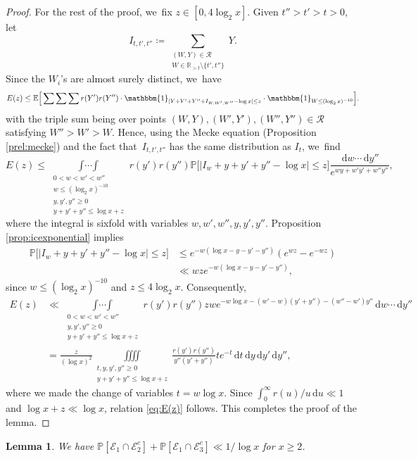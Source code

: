 \documentclass[JEP,XML,SOM,Unicode,published]{cedram}
\newcommand{\RR}{\mathbb{R}}
\newcommand{\PP}{\mathbb{P}}
\newcommand{\EE}{\mathbb{E}}
\newcommand{\dee}{\,\mathrm{d}}
\newcommand{\one}{\mathbbm{1}}
\newcommand{\EC}{\mathcal{E}}
\newcommand{\RS}{\mathscr{R}}
\newcommand{\bg}{\big}
\newcommand{\bgg}{\Big}
\theoremstyle{plain}
\newtheorem{lem}[cor]{Lemma}
\theoremstyle{definition}
\begin{document}
\begin{proof}
For the rest of the proof, we~fix $z\in[0,4\log_2x]$.
Given $t''>t'>t > 0$, let
\[
I_{t,t',t''}\coloneqq \sum_{\substack{(W,Y)\in\RS\\ W\in\RR_{>t}\setminus\{t',t''\}}} Y.
\]
Since the $W_i$'s are almost surely distinct, we~have
\begin{align*}
E(z) \le \EE\bgg[ \mathop{\sum\sum\sum}
r(Y')r(Y'') \cdot \one_{|Y+Y'+Y''+I_{W,W',W''}-\log x|\le z} \cdot \one_{W \le (\log_2x)^{-10}} \bgg].
\end{align*}
with the triple sum being over points $(W,Y),(W',Y'),(W'',Y'')\in\RS$ satisfying \hbox{$W''>W'>W$}. Hence, using the Mecke equation (Proposition \ref{prel:mecke}) and the fact that~$I_{t, t', t''}$ has the same distribution as $I_{t}$, we~find
\[
E(z) \le \mathop{\int\cdots\int}\limits_{\substack{0<w<w'<w'' \\ w\le (\log_2x)^{-10} \\ y,y',y''\ge0 \\ y+y'+y''\le \log x+z }} r(y')r(y'')
\PP\bgg[ \bg|I_w+y+y'+y''-\log x\bg|\le z\bgg]
\frac{\dee w\cdots \dee y''}{ e^{wy+w'y'+w''y''}},
\]
where the integral is sixfold with variables $w,w',w'',y,y',y''$. Proposition \ref{prop:icexponential} implies
\begin{align*}
\PP\bgg[ \bg|I_w+y+y'+y''-\log x\bg|\le z\bgg] &\le e^{-w(\log x-y-y'-y'')} (e^{wz}-e^{-wz}) \\
&\ll wz e^{-w(\log x-y-y'-y'')},
\end{align*}
since $w\le(\log_2x)^{-10}$ and $z\le 4\log_2x$. Consequently,
\[
\begin{split}
E(z) &\ll
\mathop{\int\cdots\int}\limits_{\substack{0<w<w'<w'' \\ y,y',y''\ge0 \\ y+y'+y''\le \log x+z }} r(y')r(y'')
zwe^{-w\log x-(w'-w)(y'+y'')-(w''-w')y''}\dee w\cdots \dee y'' \\
&= \frac{z}{(\log x)^2} \iiiint\limits_{\substack{t,y,y',y''\ge 0 \\ y+y'+y''\le \log x+z }} \frac{r(y')r(y'')}{y''(y'+y'')}
t e^{-t} \dee t\dee y\dee y'\dee y'',
\end{split}
\]
where we made the change of variables $t=w\log x$. Since $\int_0^\infty r(u)/u \dee u\ll 1$ and $\log x+z\ll\log x$, relation \eqref{eq:E(z)} follows. This completes the proof of the lemma.
\end{proof}

\begin{lem}
\label{lem:prob e2c e3c}
We have $\PP[\EC_1 \cap \EC_2^c] + \PP[\EC_1 \cap \EC_3^c] \ll 1/\log x$ for $x\ge2$.
\end{lem}
\end{document}
